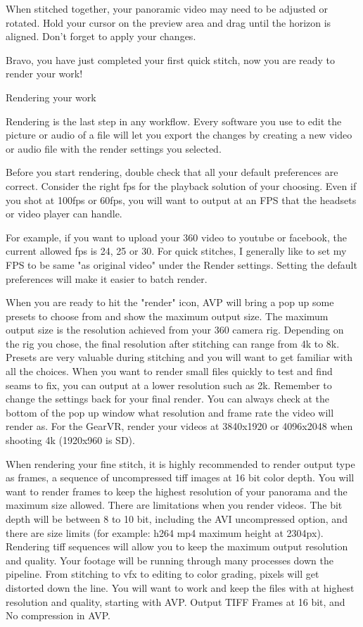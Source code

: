 \begin{fullwidth}
When stitched together, your panoramic video may need to be adjusted or rotated. Hold your cursor on the preview area and drag until the horizon is aligned. Don't forget to apply your changes.


Bravo, you have just completed your first quick stitch, now you are ready to render your work!

{\large Rendering your work \par}

Rendering is the last step in any workflow. Every software you use to edit the picture or audio of a file will let you export the changes by creating a new video or audio file with the render settings you selected.

Before you start rendering, double check that all your default preferences are correct.  Consider the right fps for the playback solution of your choosing. Even if you shot at 100fps or 60fps, you will want to output at an FPS that the headsets or video player can handle. 

For example, if you want to upload your 360 video to youtube or facebook, the current allowed fps is 24, 25 or 30. For quick stitches, I generally like to set my FPS to be same "as original video" under the Render settings. Setting the default preferences will make it easier to batch render.


When you are ready to hit the "render" icon, AVP will bring a pop up some presets to choose from and show the maximum output size. The maximum output size is the resolution achieved from your 360 camera rig. Depending on the rig you chose, the final resolution after stitching can range from 4k to 8k. Presets are very valuable during stitching and you will want to get familiar with all the choices. When you want to render small files quickly to test and find seams to fix, you can output at a lower resolution such as 2k. Remember to change the settings back for your final render. You can always check at the bottom of the pop up window what resolution and frame rate the video will render as. For the GearVR, render your videos at 3840x1920 or 4096x2048 when shooting 4k (1920x960 is SD).

When rendering your fine stitch, it is highly recommended to render output type as frames, a sequence of uncompressed tiff images at 16 bit color depth. You will want to render frames to keep the highest resolution of your panorama and the maximum size allowed. There are limitations when you render videos. The bit depth will be between 8 to 10 bit, including the AVI uncompressed option, and there are size limits (for example: h264 mp4 maximum height at 2304px). Rendering tiff sequences will allow you to keep the maximum output resolution and quality. Your footage will be running through many processes down the pipeline. From stitching to vfx to editing to color grading, pixels will get distorted down the line. You will want to work and keep the files with at highest resolution and quality, starting with AVP. Output TIFF Frames at 16 bit, and No compression in AVP.


\end{fullwidth}
